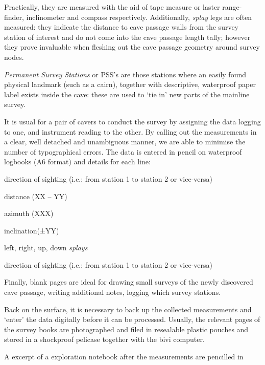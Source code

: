 Practically, they are measured with the aid of tape measure or laster range-finder, inclinometer and compass respectively. Additionally, \emph{splay} legs are often measured: they indicate the distance to cave passage walls from the survey station of interest and do not come into the cave passage length tally; however they prove invaluable when fleshing out the cave passage geometry around survey nodes.

 \emph{Permanent Survey Stations} or PSS's are those stations where an easily found physical landmark (such as a cairn), together with descriptive, waterproof paper label exists inside the cave: these are used to `tie in' new parts of the mainline survey.

It is usual for a pair of cavers to conduct the survey by assigning the data logging to one, and instrument reading to the other. By calling out the measurements in a clear, well detached and unambiguous manner, we are able to minimise the number of typographical errors. The data is entered in pencil on waterproof logbooks (A6 format) and details for each line:

\begin{citemize}
\item direction of sighting (i.e.: from station 1 to station 2 or vice-versa)
\item distance (XX – YY)
\item azimuth (XXX)
\item inclination(±YY)
\item left, right, up, down \emph{splays}
\item direction of sighting (i.e.: from station 1 to station 2 or vice-versa)
\end{citemize}

Finally, blank pages are ideal for drawing small surveys of the newly discovered cave passage, writing additional notes, logging which survey stations.

Back on the surface, it is necessary to back up the collected measurements and `enter' the data digitally before it can be processed. Usually, the relevant pages of the survey books are photographed and filed in resealable plastic pouches and stored in a shockproof pelicase together with the bivi computer. 

\begin{marginfigure}
\checkoddpage \ifoddpage \forcerectofloat \else \forceversofloat \fi
\centering
 \caption{A excerpt of a exploration notebook after the measurements are pencilled in }
 \label{notebook}
\end{marginfigure}

